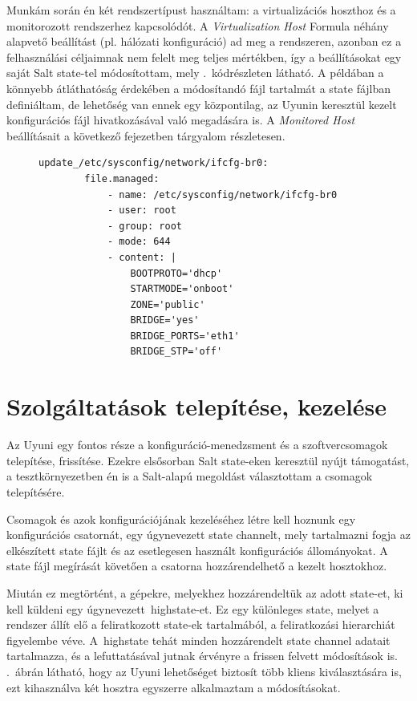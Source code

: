 Munkám során én két rendszertípust használtam: a virtualizációs hoszthoz és a monitorozott rendszerhez kapcsolódót. A \textit{Virtualization Host} Formula néhány alapvető beállítást (pl. hálózati konfiguráció) ad meg a rendszeren, azonban ez a felhasználási céljaimnak nem felelt meg teljes mértékben, így a beállításokat egy saját Salt state-tel módosítottam, mely .~kódrészleten látható. A példában a könnyebb átláthatóság érdekében a módosítandó fájl tartalmát a state fájlban definiáltam, de lehetőség van ennek egy központilag, az Uyunin keresztül kezelt konfigurációs fájl hivatkozásával való megadására is.
A \textit{Monitored Host} beállításait a következő fejezetben tárgyalom részletesen.

\begin{figure}[htb]
	\begin{lstlisting}[caption=A hálózati konfiguráció frissítését végző Salt state.,label=lst:vhost-salt-formula-mod]
	update_/etc/sysconfig/network/ifcfg-br0:
		file.managed:
			- name: /etc/sysconfig/network/ifcfg-br0
			- user: root
			- group: root
			- mode: 644
			- content: |
				BOOTPROTO='dhcp'
				STARTMODE='onboot'
				ZONE='public'
				BRIDGE='yes'
				BRIDGE_PORTS='eth1'
				BRIDGE_STP='off'\end{lstlisting}
\end{figure}

\section{Szolgáltatások telepítése, kezelése}
Az Uyuni egy fontos része a konfiguráció-menedzsment és a szoftvercsomagok telepítése, frissítése. Ezekre elsősorban Salt state-eken keresztül nyújt támogatást, a tesztkörnyezetben én is a Salt-alapú megoldást választottam a csomagok telepítésére.

Csomagok és azok konfigurációjának kezeléséhez létre kell hoznunk egy konfigurációs csatornát, egy úgynevezett state channelt, mely tartalmazni fogja az elkészített state fájlt és az esetlegesen használt konfigurációs állományokat. A state fájl megírását követően a csatorna hozzárendelhető a kezelt hosztokhoz.

Miután ez megtörtént, a gépekre, melyekhez hozzárendeltük az adott state-et, ki kell küldeni egy úgynevezett~\gls{highstate}-et. Ez egy különleges state, melyet a rendszer állít elő a feliratkozott state-ek tartalmából, a feliratkozási hierarchiát figyelembe véve. A~\gls{highstate} tehát minden hozzárendelt state channel adatait  tartalmazza, és a lefuttatásával jutnak érvényre a frissen felvett módosítások is. .~ábrán látható, hogy az Uyuni lehetőséget biztosít több kliens kiválasztására is, ezt kihasználva két hosztra egyszerre alkalmaztam a módosításokat.

